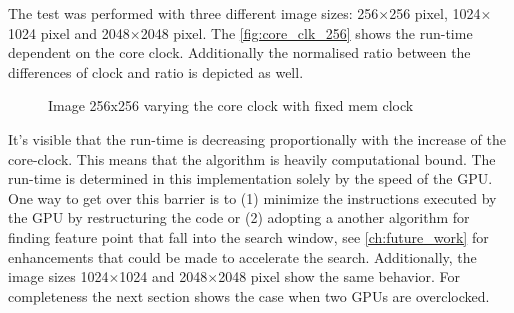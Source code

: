 The test was performed with three different image sizes: 256$\times$256 pixel, 
1024$\times$1024 pixel and 2048$\times$2048 pixel. The \autoref{fig:core_clk_256}
shows the run-time dependent on the core clock. Additionally the normalised
ratio between the differences of clock and ratio is depicted as well. 

\begin{figure}[ht]
  \centering



  \tableA

 \label{fig:core_clk_256}%
 \caption{Image 256x256 varying the core clock with fixed mem clock}
\end{figure}

It's visible that the run-time is decreasing proportionally with the increase of
the core-clock. This means that the algorithm is heavily computational bound.
The run-time is determined in this implementation solely by the speed of the
\gls{GPU}. One way to get over this barrier is to (1) minimize the instructions
executed by the \gls{GPU} by restructuring the code or (2) adopting a another
algorithm for finding feature point that fall into the search window, see
\autoref{ch:future_work} for enhancements that could be made to accelerate the
search. Additionally, the image sizes 1024$\times$1024 and 2048$\times$2048
pixel show the same behavior.
For completeness the next section shows the case when two \glspl{GPU} are 
overclocked.

